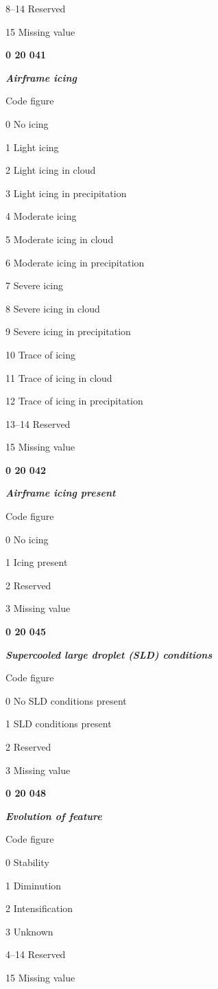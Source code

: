 8--14 Reserved

15 Missing value

\textbf{0 20 041}

\emph{\textbf{Airframe icing}}

Code figure

0 No icing

1 Light icing

2 Light icing in cloud

3 Light icing in precipitation

4 Moderate icing

5 Moderate icing in cloud

6 Moderate icing in precipitation

7 Severe icing

8 Severe icing in cloud

9 Severe icing in precipitation

10 Trace of icing

11 Trace of icing in cloud

12 Trace of icing in precipitation

13--14 Reserved

15 Missing value

\textbf{0 20 042}

\emph{\textbf{Airframe icing present}}

Code figure

0 No icing

1 Icing present

2 Reserved

3 Missing value

\textbf{0 20 045}

\emph{\textbf{Supercooled large droplet (SLD) conditions}}

Code figure

0 No SLD conditions present

1 SLD conditions present

2 Reserved

3 Missing value

\textbf{0 20 048}

\emph{\textbf{Evolution of feature}}

Code figure

0 Stability

1 Diminution

2 Intensification

3 Unknown

4--14 Reserved

15 Missing value

